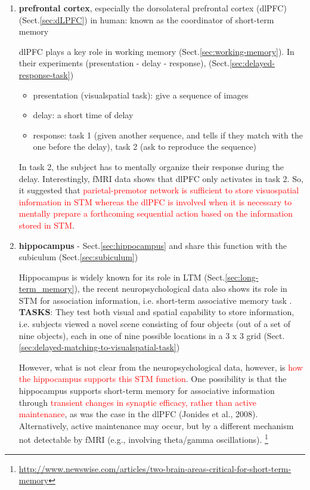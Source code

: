 \begin{enumerate}
  \item {\bf prefrontal cortex}, especially the dorsolateral prefrontal cortex
  (dlPFC) (Sect.\ref{sec:dLPFC}) in human: known as the coordinator of
  short-term memory
  
  dlPFC plays a key role in working memory (Sect.\ref{sec:working-memory}).
  In their experiments (presentation - delay -
  response), \citep{pochon2001} (Sect.\ref{sec:delayed-response-task})
  \begin{itemize}
    \item presentation (visualspatial task): give a sequence of images
    \item delay: a short time of delay
    \item response:
    task 1 (given another sequence, and tells if they match with the one before
    the delay), task 2 (ask to reproduce the sequence)
  \end{itemize}
  
  In task 2, the subject has to  mentally organize their response during the
  delay. Interestingly, fMRI data shows that dlPFC only activates in task 2. So,
  it suggested that \textcolor{red}{parietal-premotor network is sufficient to
  store visuospatial information in STM whereas the dlPFC is involved when it is
  necessary to mentally prepare a forthcoming sequential action based on the
  information stored in STM}.
 

  \item {\bf hippocampus} - Sect.\ref{sec:hippocampus} and share this function
  with the subiculum (Sect.\ref{sec:subiculum})
  
  Hippocampus is widely known for its role in LTM
  (Sect.\ref{sec:long-term_memory}), the recent neuropsychological data also
  shows its role in STM for association information, i.e. short-term associative
  memory task \citep{kumaran2008}. {\bf TASKS}: They test both visual and
  spatial capability to store information, i.e.
  subjects viewed a novel scene consisting of four objects (out of a set of nine
  objects), each in one of nine possible locations in a 3 x 3 grid
  (Sect.\ref{sec:delayed-matching-to-visualspatial-task})
  
  
  However, what is not clear from the neuropsychological data, however, is
  \textcolor{red}{how the hippocampus supports this STM function}. One
  possibility is that the hippocampus supports short-term memory for associative information
  through \textcolor{red}{transient changes in synaptic efficacy, rather than
  active maintenance}, as was the case in the dlPFC (Jonides et al.,
  2008).
  Alternatively, active maintenance may occur, but by a different mechanism not
  detectable by fMRI (e.g., involving theta/gamma oscillations).
  \footnote{\url{http://www.newswise.com/articles/two-brain-areas-critical-for-short-term-memory}}


\end{enumerate}
